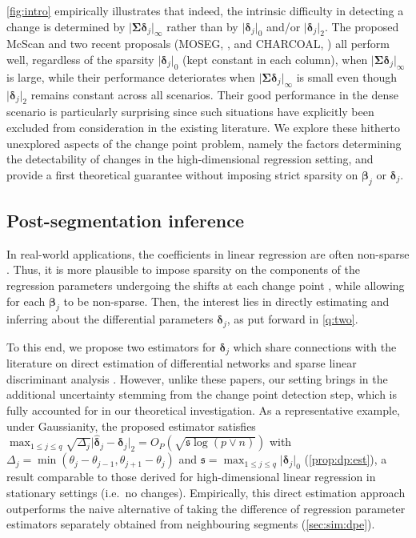 \documentclass[11pt, a4paper]{article}
\def\wh{\widehat}
\newcommand{\cp}{\theta}
\theoremstyle{definition}
\theoremstyle{definition}
\theoremstyle{definition}
\theoremstyle{definition}
\theoremstyle{definition}
\theoremstyle{remark}
\theoremstyle{definition}
\theoremstyle{definition}
\theoremstyle{definition}
\begin{document}
\cref{fig:intro} empirically illustrates that indeed, the intrinsic difficulty in detecting a change is determined by $\vert \bm\Sigma \bm\delta_j \vert_\infty$ rather than by $\vert \bm\delta_j \vert_0$ and/or $\vert \bm\delta_j \vert_2$. 
The proposed McScan and two recent proposals (MOSEG, \citealp{cho2022high}, and CHARCOAL, \citealp{gao2022sparse}) 
all perform well, regardless of the sparsity $\vert \bm\delta_j \vert_0$ (kept constant in each column), when $\vert \bm\Sigma \bm\delta_j \vert_\infty$ is large, while their performance deteriorates when $\vert \bm\Sigma \bm\delta_j \vert_\infty$ is small even though $\vert \bm\delta_j \vert_2$ remains constant across all scenarios. 
Their good performance in the dense scenario is particularly surprising since such situations have explicitly been excluded from consideration in the existing literature. 
We explore these hitherto unexplored aspects of the change point problem, namely the factors determining the detectability of changes in the high-dimensional regression setting, and provide a first theoretical guarantee without imposing strict sparsity on $\bm\beta_j$ or $\bm\delta_j$.

\subsection{Post-segmentation inference}

In real-world applications, the coefficients in linear regression are often non-sparse \citep{bradic2022testability}.
Thus, it is more plausible to impose sparsity on the components of the regression parameters undergoing the shifts at each change point \citep{gao2022sparse}, while allowing for each $\bm\beta_j$ to be non-sparse.
Then, the interest lies in directly estimating and inferring about the differential parameters $\bm\delta_j$, as put forward in \ref{q:two}.

To this end, we propose two estimators for $\bm\delta_j$ which 
share connections with the literature on direct estimation of differential networks \citep{zhao2014direct, yuan2017differential} and sparse linear discriminant analysis \citep{cai2011direct}. 
However, unlike these papers, our setting brings in the additional uncertainty stemming from the change point detection step, which is fully accounted for in our theoretical investigation. 
As a representative example, under Gaussianity, the proposed estimator satisfies $\max_{1 \le j \le q} \sqrt{\Delta_j} \vert \wh{\bm\delta}_j - \bm\delta_j \vert_2 = O_P(\sqrt{\mathfrak{s} \log(p \vee n)})$ with $\Delta_j = \min(\cp_j - \cp_{j - 1}, \cp_{j + 1} - \cp_j)$ and $\mathfrak{s} = \max_{1 \le j \le q} \vert \bm\delta_j \vert_0$ (\cref{prop:dp:est}), a result comparable to those derived for high-dimensional linear regression in stationary settings (i.e.\ no changes). 
Empirically, this direct estimation approach outperforms the naive alternative of taking the difference of regression parameter estimators separately obtained from neighbouring segments (\cref{sec:sim:dpe}).
\end{document}
